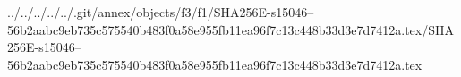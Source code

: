 ../../../../../.git/annex/objects/f3/f1/SHA256E-s15046--56b2aabc9eb735c575540b483f0a58e955fb11ea96f7c13c448b33d3e7d7412a.tex/SHA256E-s15046--56b2aabc9eb735c575540b483f0a58e955fb11ea96f7c13c448b33d3e7d7412a.tex